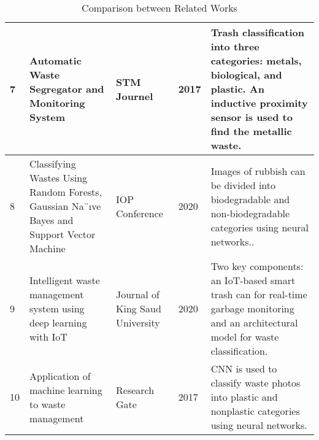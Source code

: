     \begin{table}
    	\centering
    	\caption{Comparison between Related Works}
    	\label{table }
    	\begin{tabular}{|p{.7cm}|p{3.5cm}|p{2.5cm}|p{1cm}|p{5.7cm}|}
  	
            \hline
            7 & Automatic Waste
Segregator and
Monitoring System & STM
Journel & 2017 & Trash classification into three categories: metals, biological, and plastic.
An inductive proximity sensor is used to find the metallic waste. \\
\hline
8 & Classifying Wastes
Using Random
Forests, Gaussian
Na¨ıve Bayes and
Support Vector
Machine &IOP
Conference& 2020 & Images of rubbish can be divided into biodegradable and non-biodegradable categories using neural networks..\\
\hline
9 & Intelligent waste
management system
using deep
learning with IoT & Journal
of King
Saud
University & 2020 & Two key components: an IoT-based smart trash can for real-time garbage monitoring and an architectural model for waste classification.\\
\hline
10 & Application of
machine learning
to waste management& Research
Gate & 2017&CNN is used to classify waste photos into plastic and nonplastic categories using neural networks.\\
	\hline
    

   \end{tabular}
   \end{table}
   \\\\
   